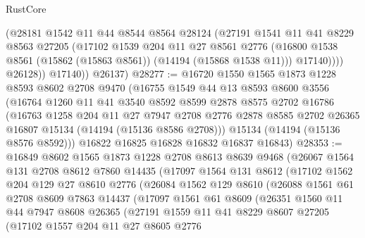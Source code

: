 \begin{lexlean}{RustCore}
\begin{coremodule}
                (@28181
                  @1542
                  @11
                  @44
                  @8544
                  @8564
                  @28124
                  (@27191
                    @1541
                    @11
                    @41
                    @8229
                    @8563
                    @27205
                    (@17102
                      @1539
                      @204
                      @11
                      @27
                      @8561
                      @2776
                      (@16800 @1538 @8561 (@15862 (@15863 @8561)) (@14194 (@15868 @1538 @11)))
                      @17140))))
              @26128))
          @17140))
      @26137)
@28277 := @16720
    @1550
    @1565
    @1873
    @1228
    @8593
    @8602
    @2708
    @9470
    (@16755
      @1549
      @44
      @13
      @8593
      @8600
      @3556
      (@16764
        @1260
        @11
        @41
        @3540
        @8592
        @8599
        @2878
        @8575
        @2702
        @16786
        (@16763
          @1258
          @204
          @11
          @27
          @7947
          @2708
          @2776
          @2878
          @8585
          @2702
          @26365
          @16807
          @15134
          (@14194 (@15136 @8586 @2708)))
        @15134
        (@14194 (@15136 @8576 @8592)))
      @16822
      @16825
      @16828
      @16832
      @16837
      @16843)
@28353 := @16849
    @8602
    @1565
    @1873
    @1228
    @2708
    @8613
    @8639
    @9468
    (@26067
      @1564
      @131
      @2708
      @8612
      @7860
      @14435
      (@17097
        @1564
        @131
        @8612
        (@17102
          @1562
          @204
          @129
          @27
          @8610
          @2776
          (@26084
            @1562
            @129
            @8610
            (@26088
              @1561
              @61
              @2708
              @8609
              @7863
              @14437
              (@17097
                @1561
                @61
                @8609
                (@26351
                  @1560
                  @11
                  @44
                  @7947
                  @8608
                  @26365
                  (@27191
                    @1559
                    @11
                    @41
                    @8229
                    @8607
                    @27205
                    (@17102
                      @1557
                      @204
                      @11
                      @27
                      @8605
                      @2776

\end{coremodule}
\end{lexlean}

